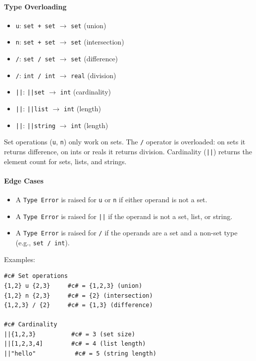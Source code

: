 \paragraph{Type Overloading}
\begin{itemize}
\item \texttt{u}: \texttt{set + set} $\rightarrow$ \texttt{set} (union)
\item \texttt{n}: \texttt{set + set} $\rightarrow$ \texttt{set} (intersection)
\item \texttt{/}: \texttt{set / set} $\rightarrow$ \texttt{set} (difference)
\item \texttt{/}: \texttt{int / int} $\rightarrow$ \texttt{real} (division)
\item \texttt{||}: \texttt{||set} $\rightarrow$ \texttt{int} (cardinality)
\item \texttt{||}: \texttt{||list} $\rightarrow$ \texttt{int} (length)
\item \texttt{||}: \texttt{||string} $\rightarrow$ \texttt{int} (length)
\end{itemize}

Set operations (\texttt{u}, \texttt{n}) only work on sets. The \texttt{/} operator is overloaded: on sets it returns difference, on ints or reals it returns division. Cardinality (\texttt{||}) returns the element count for sets, lists, and strings.

\paragraph{Edge Cases}
\begin{itemize}
\item A \texttt{Type Error} is raised for \texttt{u} or \texttt{n} if either operand is not a set.
\item A \texttt{Type Error} is raised for \texttt{||} if the operand is not a set, list, or string.
\item A \texttt{Type Error} is raised for \texttt{/} if the operands are a set and a non-set type (e.g., \texttt{set / int}).
\end{itemize}

Examples:
\begin{verbatim}
#c# Set operations
{1,2} u {2,3}     #c# = {1,2,3} (union)
{1,2} n {2,3}     #c# = {2} (intersection)
{1,2,3} / {2}     #c# = {1,3} (difference)

#c# Cardinality
||{1,2,3}          #c# = 3 (set size)
||[1,2,3,4]        #c# = 4 (list length)
||"hello"           #c# = 5 (string length)
\end{verbatim}

